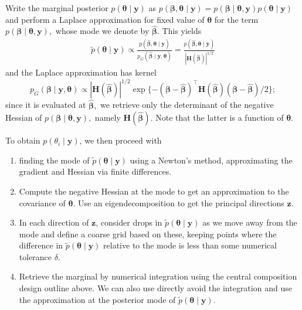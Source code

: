 \documentclass[
  11pt,
  letterpaper,
]{scrbook}
\providecommand{\tightlist}{%
  \setlength{\itemsep}{0pt}\setlength{\parskip}{0pt}}
\theoremstyle{definition}
\theoremstyle{plain}
\theoremstyle{plain}
\theoremstyle{plain}
\theoremstyle{definition}
\theoremstyle{definition}
\theoremstyle{plain}
\theoremstyle{plain}
\theoremstyle{remark}
\begin{document}
Write the marginal posterior
\(p(\boldsymbol{\theta} \mid \boldsymbol{y})\) as
\(p(\boldsymbol{\beta}, \boldsymbol{\theta} \mid \boldsymbol{y}) = p(\boldsymbol{\beta} \mid \boldsymbol{\theta}, \boldsymbol{y}) p(\boldsymbol{\theta} \mid \boldsymbol{y})\)
and perform a Laplace approximation for fixed value of
\(\boldsymbol{\theta}\) for the term
\(p(\boldsymbol{\beta} \mid \boldsymbol{\theta}, \boldsymbol{y}),\)
whose mode we denote by \(\widehat{\boldsymbol{\beta}}.\) This yields
\begin{align*}
\widetilde{p}(\boldsymbol{\theta} \mid \boldsymbol{y}) \propto \frac{p(\widehat{\boldsymbol{\beta}}, \boldsymbol{\theta} \mid \boldsymbol{y})}{ p_{G}(\widehat{\boldsymbol{\beta}} \mid \boldsymbol{y}, \boldsymbol{\theta})} = \frac{p(\widehat{\boldsymbol{\beta}}, \boldsymbol{\theta} \mid \boldsymbol{y})}{ |\mathbf{H}(\widehat{\boldsymbol{\beta}})|^{1/2}}
\end{align*} and the Laplace approximation has kernel
\[p_{G}(\boldsymbol{\beta} \mid \boldsymbol{y}, \boldsymbol{\theta}) \propto |\mathbf{H}(\widehat{\boldsymbol{\beta}})|^{1/2}\exp\{-(\boldsymbol{\beta}- \widehat{\boldsymbol{\beta}})^\top \mathbf{H}(\widehat{\boldsymbol{\beta}})(\boldsymbol{\beta}- \widehat{\boldsymbol{\beta}})/2\};\]
since it is evaluated at \(\widehat{\boldsymbol{\beta}},\) we retrieve
only the determinant of the negative Hessian of
\(p(\boldsymbol{\beta} \mid \boldsymbol{\theta}, \boldsymbol{y}),\)
namely \(\mathbf{H}(\widehat{\boldsymbol{\beta}}).\) Note that the
latter is a function of \(\boldsymbol{\theta}.\)

To obtain \(p(\theta_i \mid \boldsymbol{y})\), we then proceed with

\begin{enumerate}
\def\labelenumi{\arabic{enumi}.}
\tightlist
\item
  finding the mode of
  \(\widetilde{p}(\boldsymbol{\theta} \mid \boldsymbol{y})\) using a
  Newton's method, approximating the gradient and Hessian via finite
  differences.
\item
  Compute the negative Hessian at the mode to get an approximation to
  the covariance of \(\boldsymbol{\theta}.\) Use an eigendecomposition
  to get the principal directions \(\boldsymbol{z}\).
\item
  In each direction of \(\boldsymbol{z}\), consider drops in
  \(\widetilde{p}(\boldsymbol{\theta} \mid \boldsymbol{y})\) as we move
  away from the mode and define a coarse grid based on these, keeping
  points where the difference in
  \(\widetilde{p}(\boldsymbol{\theta} \mid \boldsymbol{y})\) relative to
  the mode is less than some numerical tolerance \(\delta.\)
\item
  Retrieve the marginal by numerical integration using the central
  composition design outline above. We can also use directly avoid the
  integration and use the approximation at the posterior mode of
  \(\widetilde{p}(\boldsymbol{\theta} \mid \boldsymbol{y}).\)
\end{enumerate}
\end{document}
